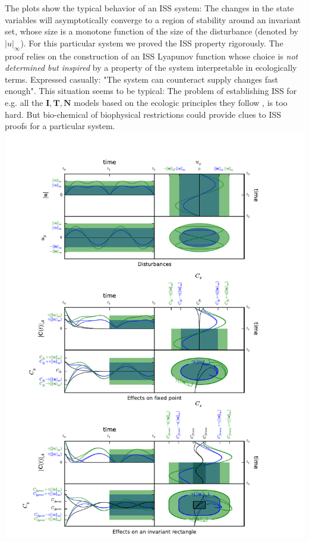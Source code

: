 \begin{multicols}{2}
The plots show the typical behavior of an ISS system: The changes in the state variables will asymptotically converge to a region of stability around an invariant set, whose size is a monotone function of the size of the disturbance (denoted by $|u|_{\infty}$).
For this particular system we proved the ISS property rigorously. The proof relies on the construction of an ISS Lyapunov function whose choice is \emph{not determined but  inspired} by a property of the system interpretable in ecologically terms. Expressed casually: "The  system can counteract supply changes fast enough".
This situation seems to be typical: The problem of establishing ISS for e.g. all the $\mathbf{I},\mathbf{T},\mathbf{N}$ models based on the ecologic principles they follow , is too hard.
But bio-chemical of biophysical restrictions could provide clues to ISS proofs for a particular system.
\\
\includegraphics[width=\columnwidth]{combiPlot2.pdf}

\end{multicols}
